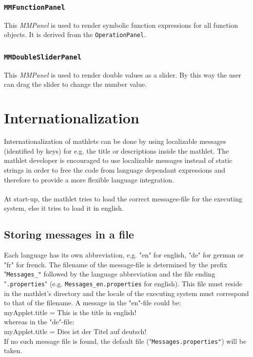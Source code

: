 \documentclass[a4paper,12pt]{book}
\newcommand{\mmp}{\emph{MMPanel }}
\begin{document}
    \subsection{{\tt MMFunctionPanel}}
    This \mmp is used to render symbolic function expressions for all function objects.
    It is derived from the {\tt OperationPanel}.

    \subsection{{\tt MMDoubleSliderPanel}}
    This \mmp is used to render double values as a slider. By this way the user can drag the slider to
    change the number value.
    
  
\chapter{Internationalization}
  Internationalization of mathlets can be done by using localizable messages (identified
  by keys) for e.g. the title or descriptions inside the mathlet.
  The mathlet developer is encouraged to use localizable messages instead of static
  strings in order to free the code from language dependant expressions
  and therefore to provide a more flexible language integration.\\\\
  At start-up, the mathlet tries to load the correct messages-file for the executing system,
  else it tries to load it in english.\\
  
  \section{Storing messages in a file}
  Each language has its own abbreviation, e.g. "en" for english, "de" for german or
  "fr" for french. The filename of the message-file is determined by the prefix
 "{\tt Messages\_"} followed by the language abbreviation and the file ending "{\tt .properties}"
  (e.g. {\tt Messages\_en.properties} for english). This file must reside in the mathlet's directory
  and the locale of the executing system must correspond to that of the filename. A message
  in the "en"-file could be:\\
  \indent myApplet.title = This is the title in english!\\
  whereas in the "de"-file:\\
  \indent myApplet.title = Dies ist der Titel auf deutsch!\\
  If no such message file is found, the default file ("{\tt Messages.properties"}) will be taken.
  
\end{document}
